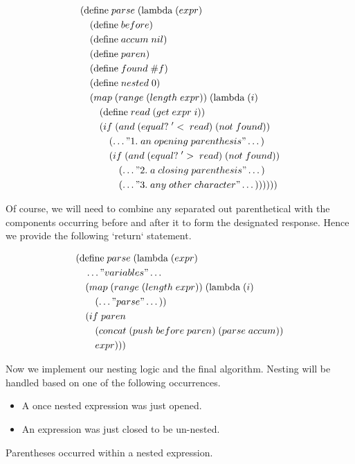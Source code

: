 \begin{align*}
& (\text{define} \; parse \; (\text{lambda} \; (expr) \; 
\\& \quad (\text{define} \; before)
\\& \quad (\text{define} \; accum \; nil)
\\& \quad (\text{define} \; paren)
\\& \quad (\text{define} \; found \; \#f)
\\& \quad (\text{define} \; nested \; 0)
\\& \quad (map \; (range \; (length \; expr)) \; (\text{lambda} \; (i)
\\& \qquad (\text{define} \; read \; (get \; expr \; i))
\\& \qquad (if \; (and \; (equal? \; '< \; read) \; (not \; found))
\\& \qquad \quad (\dots"1. \; an \; opening \; parenthesis"\dots)
\\& \qquad \quad (if \; (and \; (equal? \; '> \; read) \; (not \; found))
\\& \qquad \qquad (\dots"2. \; a \; closing \; parenthesis"\dots)
\\& \qquad \qquad (\dots"3. \; any \; other \; character"\dots))))))
\end{align*}

Of course, we will need to combine any separated out parenthetical with the components 
occurring before and after it to form the designated response. Hence we provide the 
following `return` statement.

\begin{align*}
& (\text{define} \; parse \; (\text{lambda} \; (expr) \; 
\\& \quad \dots"variables"\dots
\\& \quad (map \; (range \; (length \; expr)) \; (\text{lambda} \; (i)
\\& \qquad (\dots"parse"\dots))
\\& \quad (if \; paren
\\& \qquad (concat \; (push \; before \; paren) \; (parse \; accum))
\\& \qquad expr)))
\end{align*}

Now we implement our nesting logic and the final algorithm. Nesting will be handled 
based on one of the following occurrences.

\begin{itemize}
  \item A once nested expression was just opened.
  \item An expression was just closed to be un-nested.
\end{itemize}
 Parentheses occurred within a nested expression.

